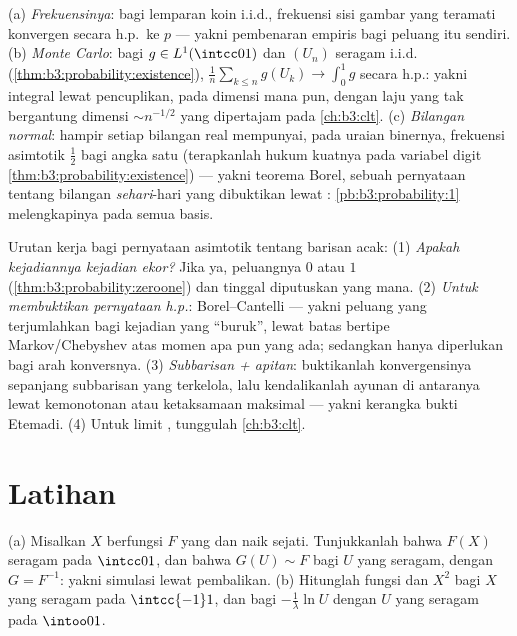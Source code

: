 \begin{example}
\label{ex:b3:probability:sllnapps}
(a) \emph{Frekuensinya}: bagi lemparan koin i.i.d., frekuensi
sisi gambar yang teramati konvergen secara h.p.\ ke $p$ --- yakni pembenaran
empiris bagi peluang itu sendiri.
(b) \emph{Monte Carlo}: bagi $g \in
L^1(\intcc01)$ dan $(U_n)$ seragam i.i.d.
(\cref{thm:b3:probability:existence}),
$\frac1n\sum_{k\leq n}g(U_k) \to \int_0^1g$ secara h.p.: yakni integral
lewat pencuplikan, pada dimensi mana pun, dengan laju yang tak bergantung
dimensi $\sim n^{-1/2}$ yang dipertajam pada \cref{ch:b3:clt}.
(c) \emph{Bilangan normal}: hampir setiap bilangan real mempunyai, pada
uraian binernya, frekuensi asimtotik $\frac12$ bagi angka satu
(terapkanlah hukum kuatnya pada variabel digit
\cref{thm:b3:probability:existence}) --- yakni teorema Borel, sebuah
pernyataan tentang bilangan \emph{sehari}-hari yang dibuktikan lewat :
\cref{pb:b3:probability:1} melengkapinya pada semua basis.
\end{example}

\begin{method}\label{met:b3:probability:toolkit}
Urutan kerja bagi pernyataan asimtotik tentang barisan
acak: (1) \emph{Apakah kejadiannya kejadian ekor?} Jika ya, peluangnya
$0$ atau $1$
(\cref{thm:b3:probability:zeroone}) dan tinggal
diputuskan yang mana. (2) \emph{Untuk membuktikan pernyataan h.p.}:
Borel--Cantelli --- yakni peluang yang terjumlahkan bagi
kejadian yang ``buruk'', lewat batas bertipe Markov/Chebyshev atas
momen apa pun yang ada; sedangkan  hanya diperlukan bagi
arah konversnya. (3) \emph{Subbarisan + apitan}: buktikanlah
konvergensinya sepanjang subbarisan yang terkelola, lalu kendalikanlah
ayunan di antaranya lewat kemonotonan atau ketaksamaan
maksimal --- yakni kerangka bukti Etemadi. (4) Untuk
limit , tunggulah \cref{ch:b3:clt}.
\end{method}

\section{Latihan}

\begin{exercise}[$\star$]\label{exo:b3:probability:1}
(a) Misalkan $X$ berfungsi  $F$ yang  dan naik
sejati. Tunjukkanlah bahwa $F(X)$ seragam pada $\intcc01$, dan
bahwa $G(U) \sim F$ bagi $U$ yang seragam, dengan $G = F^{-1}$: yakni simulasi
lewat pembalikan.
(b) Hitunglah fungsi  dan  $X^2$
bagi $X$ yang seragam pada $\intcc{-1}1$, dan bagi $-\frac1\lambda\ln
U$ dengan $U$ yang seragam pada $\intoo01$.
\end{exercise}

